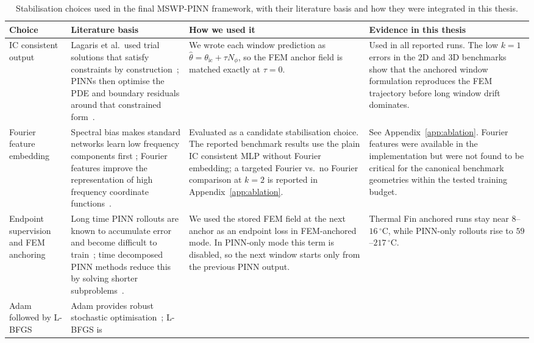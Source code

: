 \begin{table}[H]
\centering
\caption{Stabilisation choices used in the final MSWP-PINN framework, with
their literature basis and how they were integrated in this thesis.}
\label{tab:stabilisation_choices}
\scriptsize
\setlength{\tabcolsep}{3pt}
\begin{tabular}{p{}p{}p{}p{}}
\toprule
Choice & Literature basis & How we used it & Evidence in this thesis \\
\midrule
IC consistent output
& Lagaris et al.\ used trial solutions that satisfy constraints by
construction~\cite{lagaris1998}; PINNs then optimise the PDE and boundary
residuals around that constrained form~\cite{raissi2019}.
& We wrote each window prediction as
$\hat\theta=\theta_\mathrm{ic}+\tau N_\phi$, so the FEM anchor field is
matched exactly at $\tau=0$.
& Used in all reported runs.  The low $k=1$ errors in the 2D and 3D
benchmarks show that the anchored window formulation reproduces the FEM
trajectory before long window drift dominates. \\
\midrule
Fourier feature embedding
& Spectral bias makes standard networks learn low frequency components first
\cite{rahaman2019}; Fourier features improve the representation of
high frequency coordinate functions~\cite{tancik2020}.
& Evaluated as a candidate stabilisation choice.  The reported benchmark
results use the plain IC consistent MLP without Fourier embedding; a
targeted Fourier vs.\ no Fourier comparison at $k=2$ is reported in
Appendix~\ref{app:ablation}.
& See Appendix~\ref{app:ablation}.  Fourier features were available in the
implementation but were not found to be critical for the canonical
benchmark geometries within the tested training budget. \\
\midrule
Endpoint supervision and FEM anchoring
& Long time PINN rollouts are known to accumulate error and become difficult
to train~\cite{wang2021,krishnapriyan2021}; time decomposed PINN methods
reduce this by solving shorter subproblems~\cite{meng2020ppinn,wang2024causality}.
& We used the stored FEM field at the next anchor as an endpoint loss in
FEM-anchored mode.  In PINN-only mode this term is disabled, so the next
window starts only from the previous PINN output.
& Thermal Fin anchored runs stay near $8$--$16\,^\circ\mathrm{C}$, while
PINN-only rollouts rise to $59$--$217\,^\circ\mathrm{C}$. \\
\midrule
Adam followed by L-BFGS
& Adam provides robust stochastic optimisation~\cite{kingma2015}; L-BFGS is

\end{tabular}
\end{table}
